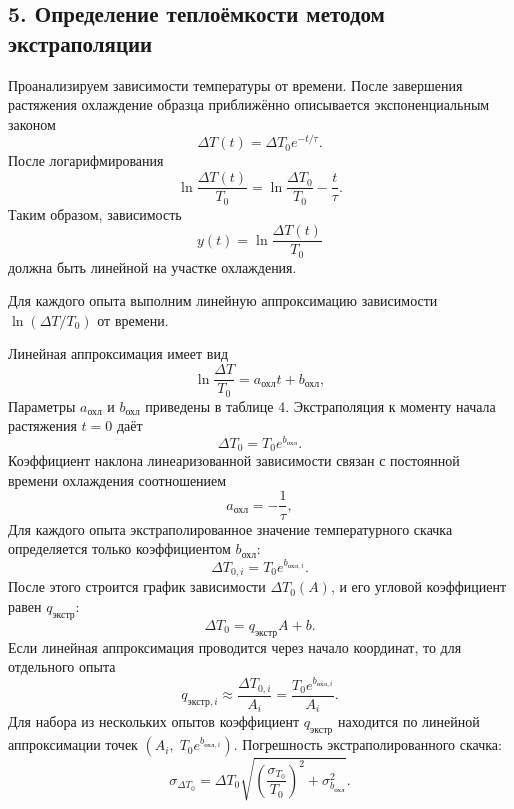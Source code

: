 \documentclass[12pt,a4paper]{article}
\numberwithin{equation}{section}
\newcommand{\compactTableStyle}{%
    \footnotesize
    \renewcommand{\arraystretch}{1.15}%
}
\begin{document}
\subsection*{5. Определение теплоёмкости методом экстраполяции}

Проанализируем зависимости температуры от времени. После завершения растяжения охлаждение образца приближённо описывается экспоненциальным законом
\[
    \Delta T(t)=\Delta T_0e^{-t/\tau}.
\]
После логарифмирования
\[
    \ln\frac{\Delta T(t)}{T_0}
    =
    \ln\frac{\Delta T_0}{T_0}
    -\frac{t}{\tau}.
\]
Таким образом, зависимость
\[
    y(t)=\ln\frac{\Delta T(t)}{T_0}
\]
должна быть линейной на участке охлаждения.

Для каждого опыта выполним линейную аппроксимацию
зависимости $\ln(\Delta T/T_0)$ от времени.

\begin{table}[H]
    \centering
    \caption{Параметры аппроксимации охлаждения образца}
    \compactTableStyle
\end{table}

Линейная аппроксимация имеет вид
\[
    \ln\frac{\Delta T}{T_0}=a_{\text{охл}}t+b_{\text{охл}},
\]
Параметры $a_{\text{охл}}$ и $b_{\text{охл}}$ приведены в таблице 4.
Экстраполяция к моменту начала растяжения $t=0$ даёт
\[
    \Delta T_0=T_0e^{b_{\text{охл}}}.
\]
Коэффициент наклона линеаризованной зависимости связан с постоянной времени охлаждения соотношением
\[
    a_{\text{охл}}=-\frac{1}{\tau},
\]
Для каждого опыта экстраполированное значение температурного скачка определяется только коэффициентом
$b_{\text{охл}}$:
\[
    \Delta T_{0,i}=T_0e^{b_{\text{охл},i}}.
\]
После этого строится график зависимости $\Delta T_0(A)$, и его угловой коэффициент равен
$q_{\text{экстр}}$:
\[
    \Delta T_0=q_{\text{экстр}}A+b.
\]
Если линейная аппроксимация проводится через начало координат, то для отдельного опыта
\[
    q_{\text{экстр},i}\approx\frac{\Delta T_{0,i}}{A_i}
    =
    \frac{T_0e^{b_{\text{охл},i}}}{A_i}.
\]
Для набора из нескольких опытов коэффициент $q_{\text{экстр}}$ находится по линейной аппроксимации точек
$\left(A_i,\;T_0e^{b_{\text{охл},i}}\right)$.
Погрешность экстраполированного скачка:
\[
    \sigma_{\Delta T_0}
    =
    \Delta T_0
    \sqrt{
        \left(\frac{\sigma_{T_0}}{T_0}\right)^2+
        \sigma_{b_{\text{охл}}}^2
    }.
\]
\end{document}
